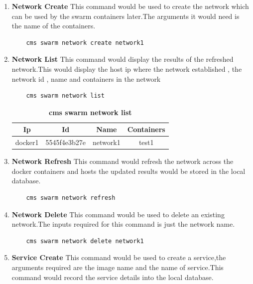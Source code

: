 \documentclass[9pt,twocolumn,twoside]{../../styles/osajnl}
\begin{document}
\begin{enumerate}
    
    \item \textbf{Network Create}
    This command would be used to create the network which can be used by the swarm containers later.The arguments it would need is the name of the containers.
    
    \begin{verbatim}
    cms swarm network create network1 
    \end{verbatim}
    
    \item \textbf{Network List}
     This command would display the results of the refreshed network.This would display the host ip where the network established , the network id , name and containers in the network\\
     
    \begin{verbatim}
    cms swarm network list  
    \end{verbatim}
    
    \begin{table}[htbp]
     \caption{\bf cms swarm network list }
     \begin{tabular}{cccc}
     \hline
      Ip & Id & Name & Containers\\
      \hline
      docker1 & 5545f4e3b27e & network1 & test1  \\
     \hline
     \end{tabular}
     \label{tab:tab6}
     \end{table}
     
    \item \textbf{Network Refresh}
    This command would refresh the network across the docker containers and hosts the updated results would be stored in the local database.\\
    
    \begin{verbatim}
    cms swarm network refresh  
    \end{verbatim}
    
    
    \item \textbf{Network Delete}
    This command would be used to delete an existing network.The inputs required for this command is just the network name.
    
    \begin{verbatim}
    cms swarm network delete network1  
    \end{verbatim}
    
    
    \item \textbf{Service Create}
    This command would be used to create a service,the arguments required are the image name and the name of service.This command would record the service details into the local database.\\
    

\end{enumerate}
\end{document}

